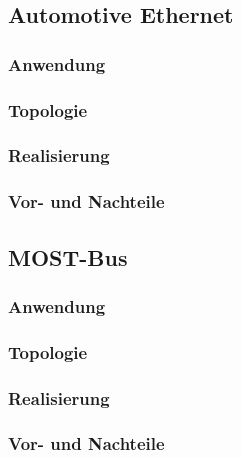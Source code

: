\subsection{Automotive Ethernet}
    \subsubsection{Anwendung}
    \subsubsection{Topologie}
    \subsubsection{Realisierung}
    \subsubsection{Vor- und Nachteile}

\subsection{MOST-Bus}
    \subsubsection{Anwendung}
    \subsubsection{Topologie}
    \subsubsection{Realisierung}
    \subsubsection{Vor- und Nachteile}
